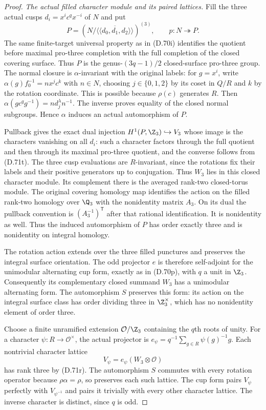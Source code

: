 \begin{proof}
\emph{The actual filled character module and its paired lattices.}
Fill the three actual cusps
$d_i=x^ic^qx^{-i}$ of $N$ and put
\[
 P=\left(N/
       \overline{\langle\!\langle d_0,d_1,d_2\rangle\!\rangle}
                   \right)^{(3)},\qquad
 p:N\twoheadrightarrow P .
                                                               \tag{D.71t}
\]
The same finite-target universal property
as in (D.70i) identifies the quotient
before maximal pro-three completion with
the full completion of the closed covering
surface. Thus $P$ is the genus-$(3q-1)/2$
closed-surface pro-three group.
The normal closure is $\alpha$-invariant
with the original labels: for
$g=x^i$, write
$\alpha(g)f_0^{-1}=n x^j c^k$
with $n\in N$, choosing $j\in\{0,1,2\}$
by its coset in $Q/R$ and $k$ by
the rotation coordinate.
This is possible because $\rho(c)$
generates $R$.
Then
$\alpha(gc^qg^{-1})=n d_j^\lambda n^{-1}$.
The inverse proves equality of the
closed normal subgroups.
Hence $\alpha$ induces an actual
automorphism of $P$.

Pullback gives the exact dual injection
$H^1(P,\Z_3)\hookrightarrow V_3$ whose
image is the characters vanishing on
all $d_i$: such a character factors
through the full quotient and then
through its maximal pro-three quotient,
and the converse follows from (D.71t).
The three cusp evaluations are
$R$-invariant, since the rotations
fix their labels and their positive
generators up to conjugation.
Thus $W_3$ lies in this closed character
module. Its complement there is the
averaged rank-two closed-torus module.
The original covering homology map identifies
the action on the filled rank-two homology
over $\Q_3$ with the nonidentity matrix $A_3$.
On its dual the pullback convention is
$(A_3^{-1})^{\mathsf T}$ after that rational
identification. It is nonidentity as well.
Thus the induced automorphism of $P$ has
order exactly three and is nonidentity
on integral homology.

The rotation action extends over the
three filled punctures and preserves
the integral surface orientation.
The odd projector $e$ is therefore
self-adjoint for the unimodular
alternating cup form, exactly as in
(D.70p), with $q$ a unit in $\Z_3$.
Consequently its complementary closed
summand $W_3$ has a unimodular
alternating form.
The automorphism $S$ preserves this
form: its action on the integral
surface class has order dividing three
in $\Z_3^\times$, which has no
nonidentity element of order three.

Choose a finite unramified extension
$\mathcal O/\Z_3$ containing the $q$th
roots of unity.
For a character $\psi:R\to\mathcal O^\times$,
the actual projector is
$e_\psi=q^{-1}\sum_{g\in R}\psi(g)^{-1}g$.
Each nontrivial character lattice
\[
                 V_\psi=e_\psi(W_3\otimes\mathcal O)
                                                               \tag{D.71u}
\]
has rank three by (D.71r).
The automorphism $S$ commutes with
every rotation operator because
$\rho\alpha=\rho$, so preserves
each such lattice.
The cup form pairs $V_\psi$
perfectly with $V_{\psi^{-1}}$
and pairs it trivially with every
other character lattice.
The inverse character is distinct,
since $q$ is odd.


\end{proof}
